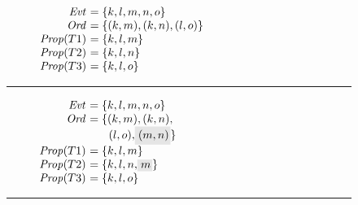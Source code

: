 \begin{figure}
  \begin{subfigure}{.5\textwidth}
\begin{center}
\end{center}
    \caption{}
    \label{fig:armvpop:flpop:1}
  \end{subfigure}%
  \begin{subfigure}{.5\textwidth}
\begin{center}
\parbox{63mm}{$\begin{array}{@{}r@{~}l@{}}
  \Evt      &= \{k, l, m, n, o\} \\
  \Ord      &= \{ (k, m), (k, n), (l, o) \} \\
  \Prop(T1) &= \{k, l, m\} \\
  \Prop(T2) &= \{k, l, n\} \\
  \Prop(T3) &= \{k, l, o\} \\
\end{array}$}
\end{center}
    \caption{}
    \label{fig:armvpop:flpop:2}
  \end{subfigure}
  \hrule

  \begin{subfigure}{.5\textwidth}
\begin{center}
\end{center}
    \caption{}
    \label{fig:armvpop:flpop:3}
  \end{subfigure}%
  \begin{subfigure}{.5\textwidth}
\begin{center}
\parbox{63mm}{$\begin{array}{@{}r@{~}l@{}}
  \Evt      &= \{k, l, m, n, o\} \\
  \Ord      &= \{ (k, m), (k, n), \\
            & ~~\quad (l, o), \graybox{(m, n)} \} \\
  \Prop(T1) &= \{k, l, m\} \\
  \Prop(T2) &= \{k, l, n, \graybox{m}\} \\
  \Prop(T3) &= \{k, l, o\} \\
\end{array}$}
\end{center}
    \caption{}
    \label{fig:armvpop:flpop:4}
  \end{subfigure}
  \hrule


\end{figure}
